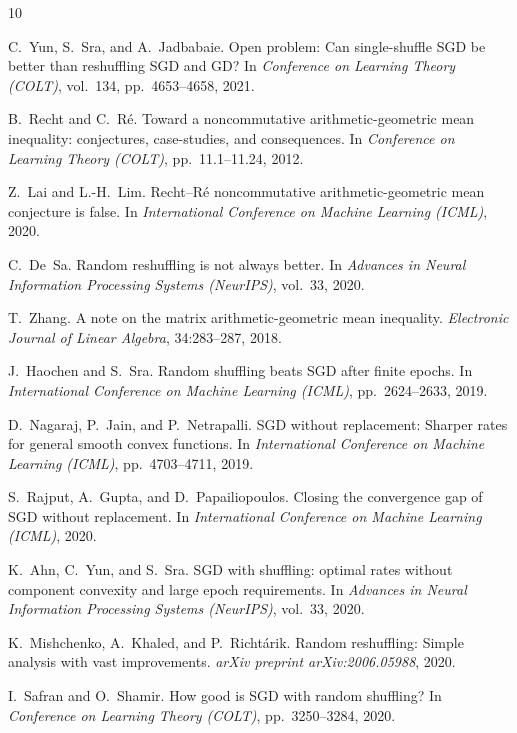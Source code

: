 \documentclass[11pt]{article}
\theoremstyle{definition}
\theoremstyle{remark}
\begin{document}
\begin{thebibliography}{10}

C.~Yun, S.~Sra, and A.~Jadbabaie.
\newblock Open problem: Can single-shuffle SGD be better than reshuffling SGD and GD?
\newblock In \emph{Conference on Learning Theory (COLT)}, vol.\ 134, pp.\ 4653--4658, 2021.

B.~Recht and C.~R\'e.
\newblock Toward a noncommutative arithmetic-geometric mean inequality: conjectures, case-studies, and
consequences.
\newblock In \emph{Conference on Learning Theory (COLT)}, pp.\ 11.1--11.24, 2012.

Z.~Lai and L.-H.~Lim.
\newblock Recht--R\'e noncommutative arithmetic-geometric mean conjecture is false.
\newblock In \emph{International Conference on Machine Learning (ICML)}, 2020.

C.~De~Sa.
\newblock Random reshuffling is not always better.
\newblock In \emph{Advances in Neural Information Processing Systems (NeurIPS)}, vol.\ 33, 2020.

T.~Zhang.
\newblock A note on the matrix arithmetic-geometric mean inequality.
\newblock \emph{Electronic Journal of Linear Algebra}, 34:283--287, 2018.

J.~Haochen and S.~Sra.
\newblock Random shuffling beats SGD after finite epochs.
\newblock In \emph{International Conference on Machine Learning (ICML)}, pp.\ 2624--2633, 2019.

D.~Nagaraj, P.~Jain, and P.~Netrapalli.
\newblock SGD without replacement: Sharper rates for general smooth convex functions.
\newblock In \emph{International Conference on Machine Learning (ICML)}, pp.\ 4703--4711, 2019.

S.~Rajput, A.~Gupta, and D.~Papailiopoulos.
\newblock Closing the convergence gap of SGD without replacement.
\newblock In \emph{International Conference on Machine Learning (ICML)}, 2020.

K.~Ahn, C.~Yun, and S.~Sra.
\newblock SGD with shuffling: optimal rates without component convexity and large epoch requirements.
\newblock In \emph{Advances in Neural Information Processing Systems (NeurIPS)}, vol.\ 33, 2020.

K.~Mishchenko, A.~Khaled, and P.~Richt\'arik.
\newblock Random reshuffling: Simple analysis with vast improvements.
\newblock \emph{arXiv preprint arXiv:2006.05988}, 2020.

I.~Safran and O.~Shamir.
\newblock How good is SGD with random shuffling?
\newblock In \emph{Conference on Learning Theory (COLT)}, pp.\ 3250--3284, 2020.

\end{thebibliography}
\end{document}
